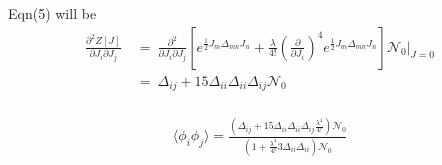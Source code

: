 \documentclass[12pt, letterpaper]{article}
\newcommand*{\1}{\hspace{1pt}}
\begin{document}
    Eqn(5) will be
    \begin{align}
        \frac{\partial ^{2} Z[J]}{\partial J_{i} \partial J_{j}} \ &  = \ \frac{\partial ^{2}}{\partial J_{i} \partial J_{j}} [e^{\frac{1}{2} J_{m} \Delta _{mn} J_{n}} + \frac{\lambda}{4!}(\frac{\partial}{\partial J_{i}})^{4} e^{\frac{1}{2} J_{m} \Delta _{mn} J_{n}} ] \mathcal{N}_{0} \Biggr|_{J=0} \\
        & =  \ \Delta_{ij} + 15\Delta_{ii}\Delta_{ii}\Delta_{ij}\mathcal{N_{0}}\\ 
    \end{align}

    \begin{align}
        \langle \phi_{i}\phi_{j} \rangle = \frac{(\Delta_{ij} + 15\Delta_{ii}\Delta_{ii}\Delta_{ij}\frac{\lambda^4}{4!})\mathcal{N_{0}}}{(1+\frac{\lambda^4}{4!}3\Delta_{ii}\Delta_{ii})\mathcal{N_{0}}}
    \end{align}
\end{document}

